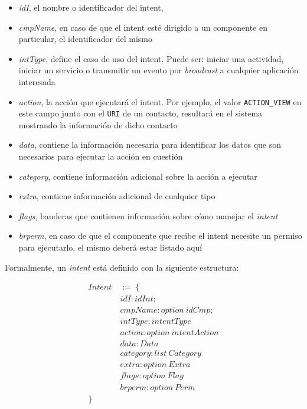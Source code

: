 \begin{itemize}
    \item \textit{idI}, el nombre o identificador del intent,
    \item \textit{cmpName}, en caso de que el intent esté dirigido a un componente en particular, el
    identificador del mismo
    \item \textit{intType}, define el caso de uso del intent. Puede ser: iniciar una actividad, iniciar
    un servicio o transmitir un evento por \textit{broadcast} a cualquier aplicación interesada
	\item \textit{action}, la acción que ejecutará el intent. Por ejemplo, el valor \texttt{ACTION\_VIEW}
	en este campo junto con el \texttt{URI} de un contacto, resultará en el sistema mostrando la
	información de dicho contacto
    \item \textit{data}, contiene la información necesaria para identificar los datos que son necesarios
    para ejecutar la acción en cuestión
    \item \textit{category}, contiene información adicional sobre la acción a ejecutar
    \item \textit{extra}, contiene información adicional de cualquier tipo
    \item \textit{flags}, banderas que contienen información sobre cómo manejar el \textit{intent}
    \item\textit{brperm}, en caso de que el componente que recibe el intent necesite un permiso para
    ejecutarlo, el mismo deberá estar listado aquí
\end{itemize}


Formalmente, un \textit{intent} está definido con la siguiente estructura:

\begin{align*}
    Intent\ &:=\ \{ \\
        &idI: idInt; \\
        &cmpName: option\ idCmp; \\
        &intType: intentType \\
        &action: option\ intentAction \\
        &data: Data \\
        &category: list\ Category \\
        &extra: option\ Extra \\
        &flags: option\ Flag \\
        &brperm: option\ Perm \\
    \}
\end{align*}

